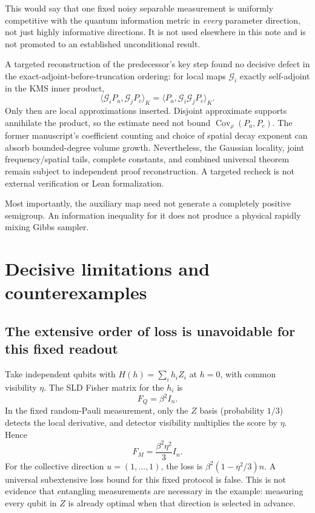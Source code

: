\documentclass[11pt,a4paper]{article}
\theoremstyle{remark}
\newcommand{\Cov}{\operatorname{Cov}}
\begin{document}
This would say that one fixed noisy separable measurement is uniformly competitive with the quantum information metric in \emph{every} parameter direction, not just highly informative directions. It is not used elsewhere in this note and is not promoted to an established unconditional result.

A targeted reconstruction of the predecessor's key step found no decisive defect in the exact-adjoint-before-truncation ordering: for local maps $\mathcal G_i$ exactly self-adjoint in the KMS inner product,
\[
 \langle\mathcal G_iP_a,\mathcal G_jP_c\rangle_K
 =\langle P_a,\mathcal G_i\mathcal G_jP_c\rangle_K.
\]
Only then are local approximations inserted. Disjoint approximate supports annihilate the product, so the estimate need not bound $\Cov_\rho(P_a,P_c)$. The former manuscript's coefficient counting and choice of spatial decay exponent can absorb bounded-degree volume growth. Nevertheless, the Gaussian locality, joint frequency/spatial tails, complete constants, and combined universal theorem remain subject to independent proof reconstruction. A targeted recheck is not external verification or Lean formalization.

Most importantly, the auxiliary map need not generate a completely positive semigroup. An information inequality for it does not produce a physical rapidly mixing Gibbs sampler.

\section{Decisive limitations and counterexamples}

\subsection{The extensive order of loss is unavoidable for this fixed readout}
Take independent qubits with $H(h)=\sum_i h_iZ_i$ at $h=0$, with common visibility $\eta$. The SLD Fisher matrix for the $h_i$ is
\[
 F_Q=\beta^2 I_n.
\]
In the fixed random-Pauli measurement, only the $Z$ basis (probability $1/3$) detects the local derivative, and detector visibility multiplies the score by $\eta$. Hence
\begin{equation}
 F_M=\frac{\beta^2\eta^2}{3}I_n.
 \label{eq:sharpness}
\end{equation}
For the collective direction $u=(1,\ldots,1)$, the loss is $\beta^2(1-\eta^2/3)n$. A universal subextensive loss bound for this fixed protocol is false. This is not evidence that entangling measurements are necessary in the example: measuring every qubit in $Z$ is already optimal when that direction is selected in advance.
\end{document}

